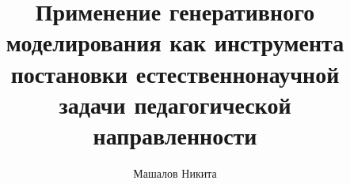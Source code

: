 \documentclass{mipt-thesis-bs}
\title{Применение генеративного моделирования как инструмента постановки естественнонаучной задачи педагогической направленности}
\author{Машалов Никита}
\begin{document}






\printbib
\end{document}
